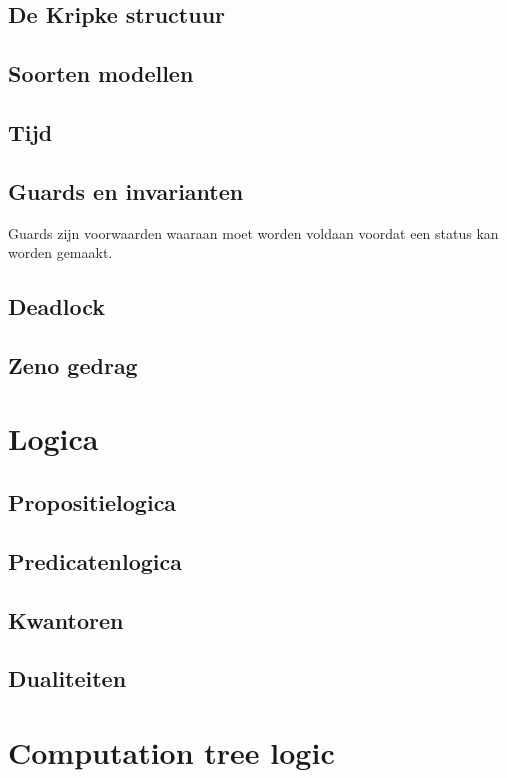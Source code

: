 \documentclass{article}%
\begin{document}
\subsection{De Kripke structuur}

\subsection{Soorten modellen}

\subsection{Tijd}

\subsection{Guards en invarianten}
Guards zijn voorwaarden waaraan moet worden voldaan voordat een status kan worden gemaakt.

\subsection{Deadlock}

\subsection{Zeno gedrag}

\section{Logica}

\subsection{Propositielogica}

\subsection{Predicatenlogica}

\subsection{Kwantoren}

\subsection{Dualiteiten}

\section{Computation tree logic}
\end{document}
